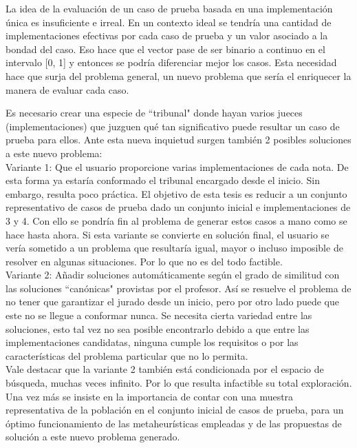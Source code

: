 \documentclass[a4paper,openright,11pt,oneside]{book}
\begin{document}
	La idea de la evaluación de un caso de prueba basada en una implementación única es insuficiente e irreal. En un contexto ideal se tendría una cantidad de implementaciones efectivas por cada caso de prueba y un valor asociado a la bondad del caso. Eso hace que el vector pase de ser binario a continuo en el intervalo [0, 1] y entonces se podría diferenciar mejor los casos. Esta necesidad hace que surja del problema general, un nuevo problema que sería el enriquecer la manera de evaluar cada caso.
	
	Es necesario crear una especie de ``tribunal" donde hayan varios jueces (implementaciones) que juzguen qué tan significativo puede resultar un caso de prueba para ellos. Ante esta nueva inquietud surgen también 2 posibles soluciones a este nuevo problema: \\
	
 	Variante 1: Que el usuario proporcione varias implementaciones de cada nota. De esta forma ya estaría conformado el tribunal encargado desde el inicio. Sin embargo, resulta poco práctica. El objetivo de esta tesis es reducir a un conjunto representativo de casos de prueba dado un conjunto inicial e implementaciones de 3 y 4. Con ello se pondría fin al problema de generar estos casos a mano como se hace hasta ahora. Si esta variante se convierte en solución final, el usuario se vería sometido a un problema que resultaría igual, mayor o incluso imposible de resolver en algunas situaciones. Por lo que no es del todo factible. \\
	
	Variante 2: Añadir soluciones automáticamente según el grado de similitud con las soluciones ``canónicas" provistas por el profesor. Así se resuelve el problema de no tener que garantizar el jurado desde un inicio, pero por otro lado puede que este no se llegue a conformar nunca. Se necesita cierta variedad entre las soluciones, esto tal vez no sea posible encontrarlo debido a que entre las implementaciones candidatas, ninguna cumple los requisitos o por las características del problema particular que no lo permita. \\
	
	Vale destacar que la variante 2 también está condicionada por el espacio de búsqueda, muchas veces infinito. Por lo que resulta infactible su total exploración. Una vez más se insiste en la importancia de contar con una muestra representativa de la población en el conjunto inicial de casos de prueba, para un óptimo funcionamiento de las metaheurísticas empleadas y de las propuestas de solución a este nuevo problema generado. \\
	
\end{document}
